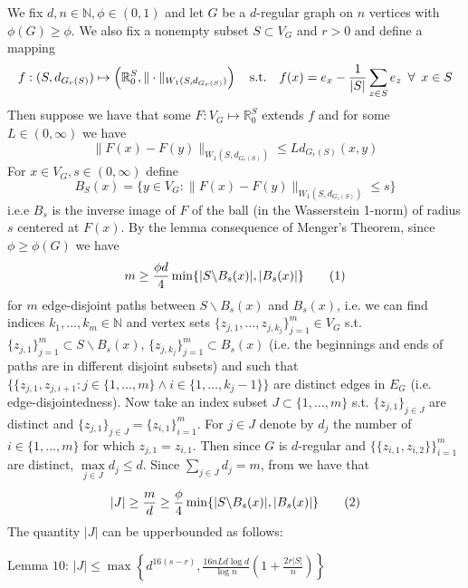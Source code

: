 We fix $d,n\in\mathbb{N},\phi\in(0,1)$ and let $G$ be a $d$-regular graph on $n$ vertices with $\phi(G)\ge\phi$. We also fix a nonempty subset $S\subset V_G$ and $r>0$ and define a mapping
$$f:(S,d_{G_r(S)})\mapsto\left(\mathbb{R}_0^S,\|\cdot\|_{W_1(S,d_{G_r(S)})}\right)\quad\textrm{s.t.}\quad f(x)=e_x-\frac{1}{|S|}\sum\limits_{z\in S}e_z\enskip\forall\enskip x\in S$$
Then suppose we have that some $F:V_G\mapsto\mathbb{R}_0^S$ extends $f$ and for some $L\in(0,\infty)$ we have
$$\|F(x)-F(y)\|_{W_1(S,d_{G_r(S)})}\le Ld_{G_r(S)}(x,y)$$
For $x\in V_G,s\in(0,\infty)$ define 
$$B_S(x)=\{y\in V_G:\|F(x)-F(y)\|_{W_1(S,d_{G_r(S)})}\le s\}$$
i.e.e $B_s$ is the inverse image of $F$ of the ball (in the Wasserstein 1-norm) of radius $s$ centered at $F(x)$. By the lemma consequence of Menger's Theorem, since $\phi\ge\phi(G)$ we have
$$m\ge\frac{\phi d}{4}\min\{|S\backslash B_s(x)|,|B_s(x)|\}\qquad(1)$$
for $m$ edge-disjoint paths between $S\backslash B_s(x)$ and $B_s(x)$, i.e. we can find indices $k_1,\dots,k_m\in\mathbb{N}$ and vertex sets $\{z_{j,1},\dots,z_{j,k_j}\}_{j=1}^m\in V_G$ s.t. $\{z_{j,1}\}_{j=1}^m\subset S\backslash B_s(x)$, $\{z_{j,k_j}\}_{j=1}^m\subset B_s(x)$ (i.e. the beginnings and ends of paths are in different disjoint subsets) and such that $\{\{z_{j,1},z_{j,i+1}:j\in\{1,\dots,m\}\wedge i\in\{1,\dots,k_j-1\}\}$ are distinct edges in $E_G$ (i.e. edge-disjointedness). Now take an index subset $J\subset\{1,\dots,m\}$ s.t. $\{z_{j,1}\}_{j\in J}$ are distinct and $\{z_{j,1}\}_{j\in J}=\{z_{i,1}\}_{i=1}^m$. For $j\in J$ denote by $d_j$ the number of $i\in\{1,\dots,m\}$ for which $z_{j,1}=z_{i,1}$. Then since $G$ is $d$-regular and $\{\{z_{i,1},z_{i,2}\}\}_{i=1}^m$ are distinct, $\max\limits_{j\in J}d_j\le d$. Since $\sum\limits_{j\in J}d_j=m$, from  we have that
$$|J|\ge\frac{m}{d}\ge\frac{\phi}{4}\min\{|S\backslash B_s(x)|,|B_s(x)|\}\qquad(2)$$
\noindent The quantity $|J|$ can be upperbounded as follows:\\
\begin{lem} Lemma $10$:
$|J|\le\max\left\{d^{16(s-r)},\frac{16nLd\log d}{\log n}\left(1+\frac{2r|S|}{n}\right)\right\}$
\end{lem}
